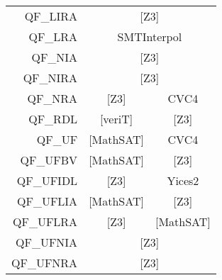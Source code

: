 \begin{table}
{\begin{tabular}{rccc}
    \multicolumn{1}{r|}{QF\_LIRA}   & \multicolumn{3}{c|}{{[}Z3{]}}                                                                                     \\ \cline{2-4} 
    \multicolumn{1}{r|}{QF\_LRA}    & \multicolumn{3}{c|}{SMTInterpol}                                                                                  \\ \cline{2-4} 
    \multicolumn{1}{r|}{QF\_NIA}    & \multicolumn{3}{c|}{{[}Z3{]}}                                                                                     \\ \cline{2-4} 
    \multicolumn{1}{r|}{QF\_NIRA}   & \multicolumn{3}{c|}{{[}Z3{]}}                                                                                     \\ \cline{2-4} 
    \multicolumn{1}{r|}{QF\_NRA}    & \multicolumn{1}{c|}{{[}Z3{]}}      & \multicolumn{2}{c|}{CVC4}                                                    \\ \cline{2-4} 
    \multicolumn{1}{r|}{QF\_RDL}    & \multicolumn{1}{c|}{{[}veriT{]}}   & \multicolumn{2}{c|}{{[}Z3{]}}                                                \\ \cline{2-4} 
    \multicolumn{1}{r|}{QF\_UF}     & \multicolumn{1}{c|}{{[}MathSAT{]}} & \multicolumn{2}{c|}{CVC4}                                                    \\ \cline{2-4} 
    \multicolumn{1}{r|}{QF\_UFBV}   & \multicolumn{2}{c|}{{[}MathSAT{]}}                                             & \multicolumn{1}{c|}{{[}Z3{]}}    \\ \cline{2-4} 
    \multicolumn{1}{r|}{QF\_UFIDL}  & \multicolumn{2}{c|}{{[}Z3{]}}                                                  & \multicolumn{1}{c|}{Yices2}      \\ \cline{2-4} 
    \multicolumn{1}{r|}{QF\_UFLIA}  & \multicolumn{1}{c|}{{[}MathSAT{]}} & \multicolumn{2}{c|}{{[}Z3{]}}                                                \\ \cline{2-4} 
    \multicolumn{1}{r|}{QF\_UFLRA}  & \multicolumn{1}{c|}{{[}Z3{]}}      & \multicolumn{2}{|c|}{{[}MathSAT{]}}                                          \\ \cline{2-4} 
    \multicolumn{1}{r|}{QF\_UFNIA}  & \multicolumn{3}{c|}{{[}Z3{]}}                                                                                     \\ \cline{2-4} 
    \multicolumn{1}{r|}{QF\_UFNRA}  & \multicolumn{3}{c|}{{[}Z3{]}}                                                                                     \\ \cline{2-4} 

\end{tabular}}
\end{table}

